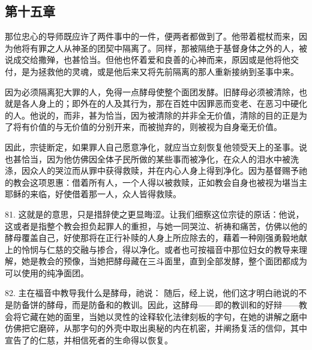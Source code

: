 
\subsection{第十五章}

\par

那位忠心的导师既应许了两件事中的一件，便两者都做到了。他带着棍杖而来，因为他将有罪之人从神圣的团契中隔离了。同样，那被隔绝于基督身体之外的人，被说成交给撒殚，也甚恰当。但他也怀着爱和良善的心神而来，原因或是他将他交付，是为拯救他的灵魂，或是他后来又将先前隔离的那人重新接纳到圣事中来。\par

因为必须隔离犯大罪的人，免得一点酵母使整个面团发酵。旧酵母必须被清除，也就是各人身上的；即外在的人及其行为，那在百姓中因罪恶而变老、在恶习中硬化的人。他说的，而非，甚为恰当，因为被清除的并非全无价值，清除的目的正是为了将有价值的与无价值的分别开来，而被抛弃的，则被视为自身毫无价值。\par

因此，宗徒断定，如果罪人自己愿意净化，就应当立刻恢复他领受天上的圣事。说也甚恰当，因为他仿佛因全体子民所做的某些事而被净化，在众人的泪水中被洗涤，因众人的哭泣而从罪中获得救赎，并在内心人身上得到净化。因为基督赐予祂的教会这项恩惠：借着所有人，一个人得以被救赎，正如教会自身也被视为堪当主耶稣的来临，好使借着那一人，众人皆得救赎。\par

81. 这就是的意思，只是措辞使之更显晦涩。让我们细察这位宗徒的原话：他说， 这或者是指整个教会担负起罪人的重担，与她一同哭泣、祈祷和痛苦，仿佛以他的酵母覆盖自己，好使那将在正行补赎的人身上所应除去的，藉着一种刚强勇毅地献上的怜悯与仁慈的交融与掺合，得以净化。或者也可按福音中那位妇女的教导来理解，她是教会的预像，当她把酵母藏在三斗面里，直到全部发酵，整个面团都成为可以使用的纯净面团。\par

82. 主在福音中教导我什么是酵母，祂说： 随后，经上说，他们这才明白祂说的不是防备饼的酵母，而是防备和的教训。因此，这酵母——即的教训和的好辩——教会将它藏在她的面里，当她以灵性的诠释软化法律刻板的字句，在她的讲解之磨中仿佛把它磨碎，从那字句的外壳中取出奥秘的内在机密，并阐扬复活的信仰，其中宣告了的仁慈，并相信死者的生命得以恢复。\par


